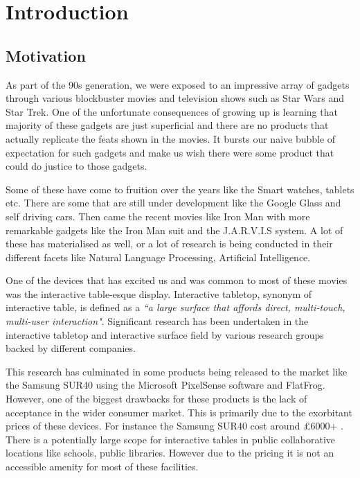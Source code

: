 
\chapter{Introduction}

\section{Motivation}
As part of the 90s generation, we were exposed to an impressive array of gadgets through various blockbuster movies and television shows such as Star Wars and Star Trek. One of the unfortunate consequences of growing up is learning that majority of these gadgets are just superficial and there are no products that actually replicate the feats shown in the movies. It bursts our naive bubble of expectation for such gadgets and make us wish there were some product that could do justice to those gadgets. 

Some of these have come to fruition over the years like the Smart watches, tablets etc. There are some that are still under development like the Google Glass and self driving cars. Then came the recent movies like Iron Man with more remarkable gadgets like the Iron Man suit and the J.A.R.V.I.S system\cite{jarvis}. A lot of these has materialised as well, or a lot of research is being conducted in their different facets like Natural Language Processing\cite{nlp}, Artificial Intelligence\cite{ai-latest}.

One of the devices that has excited us and was common to most of these movies was the interactive table-esque display. Interactive tabletop, synonym of interactive table, is defined as a \emph{``a large surface that affords direct, multi-touch, multi-user interaction"}\cite{interactive-table-def}. Significant research has been undertaken in the interactive tabletop and interactive surface field by various research groups backed by different companies\cite{lightspace, surfacephone, connectables}. 

This research has culminated in some products being released to the market like the Samsung SUR40 using the Microsoft PixelSense software\cite{samsung-sur40} and FlatFrog\cite{flatfrog}. However, one of the biggest drawbacks for these products is the lack of acceptance in the wider consumer market. This is primarily due to the exorbitant prices of these devices. For instance the Samsung SUR40 cost around \pounds 6000+ \cite{samsung-sur40-price}. There is a potentially large scope for interactive tables in public collaborative locations like schools, public libraries. However due to the pricing it is not an accessible amenity for most of these facilities.

